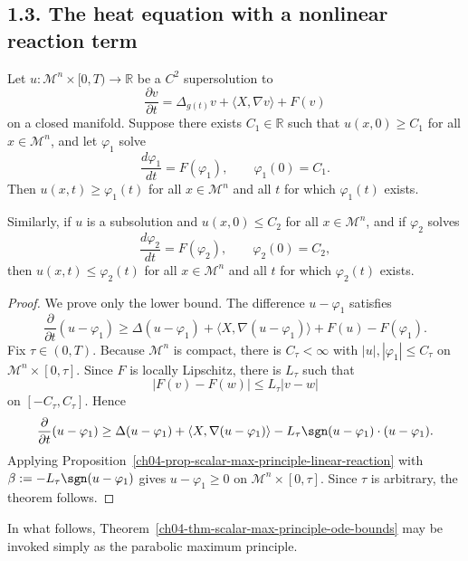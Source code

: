 \subsection*{1.3. The heat equation with a nonlinear reaction term}

\begin{theorem}
\label{ch04-thm-scalar-max-principle-ode-bounds}
Let \(u : \mathcal M^n \times [0,T) \to \mathbb R\) be a \(C^2\) supersolution to
\[
\frac{\partial v}{\partial t} = \Delta_{g(t)} v + \langle X, \nabla v \rangle + F(v)
\]
on a closed manifold. Suppose there exists \(C_1 \in \mathbb R\) such that \(u(x,0)\ge C_1\) for all \(x \in \mathcal M^n\), and let \(\varphi_1\) solve
\[
\frac{d\varphi_1}{dt}=F(\varphi_1),\qquad \varphi_1(0)=C_1.
\]
Then \(u(x,t)\ge \varphi_1(t)\) for all \(x \in \mathcal M^n\) and all \(t\) for which \(\varphi_1(t)\) exists.

Similarly, if \(u\) is a subsolution and \(u(x,0)\le C_2\) for all \(x \in \mathcal M^n\), and if \(\varphi_2\) solves
\[
\frac{d\varphi_2}{dt}=F(\varphi_2),\qquad \varphi_2(0)=C_2,
\]
then \(u(x,t)\le \varphi_2(t)\) for all \(x \in \mathcal M^n\) and all \(t\) for which \(\varphi_2(t)\) exists.
\end{theorem}

\begin{proof}
\sketch {}
We prove only the lower bound. The difference \(u-\varphi_1\) satisfies
\[
\frac{\partial}{\partial t}(u-\varphi_1)\ge \Delta(u-\varphi_1)+\langle X,\nabla(u-\varphi_1)\rangle+F(u)-F(\varphi_1).
\]
Fix \(\tau\in(0,T)\). Because \(\mathcal M^n\) is compact, there is \(C_\tau<\infty\) with \(|u|,|\varphi_1|\le C_\tau\) on \(\mathcal M^n\times[0,\tau]\). Since \(F\) is locally Lipschitz, there is \(L_\tau\) such that
\[
|F(v)-F(w)|\le L_\tau |v-w|
\]
on \([-C_\tau,C_\tau]\). Hence
\[
\frac{\partial}{\partial t}(u-\varphi_1)\ge \Delta(u-\varphi_1)+\langle X,\nabla(u-\varphi_1)\rangle -L_\tau \sgn(u-\varphi_1)\cdot(u-\varphi_1).
\]
Applying Proposition~\ref{ch04-prop-scalar-max-principle-linear-reaction} with \(\beta:=-L_\tau\sgn(u-\varphi_1)\) gives \(u-\varphi_1\ge 0\) on \(\mathcal M^n\times[0,\tau]\). Since \(\tau\) is arbitrary, the theorem follows.
\end{proof}

\begin{remark}
\label{ch04-rem-use-parabolic-maximum-principle}
In what follows, Theorem~\ref{ch04-thm-scalar-max-principle-ode-bounds} may be invoked simply as the parabolic maximum principle.
\end{remark}

